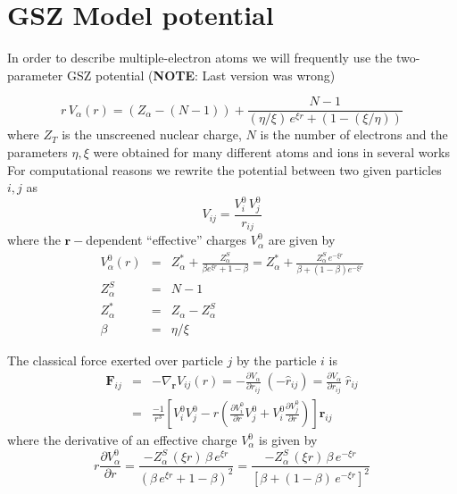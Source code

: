 
\section{GSZ Model potential}

In order to describe multiple-electron atoms we will frequently use the
two-parameter GSZ potential \cite{Garvey1975PRAp1144} (\textbf{NOTE}: Last version was wrong)

\begin{equation}\label{Q:GSZ-V1}
r \, V_{\alpha}(r) =  (Z_{\alpha} - (N - 1)) + \frac{N-1}{\left(
{\eta}/{\xi} \right) \, e^{\xi r} + (1 - \left( {\xi}/{\eta}
\right))}
\end{equation}
where $Z_{T}$ is the unscreened nuclear charge, $N$ is the number of
electrons and the parameters $\eta,\xi$ were obtained for many
different atoms and ions in several works
\cite{Szydlik1974PRAp1885,Garvey1975PRAp1144}
%
For computational reasons we rewrite the potential between two given
particles $i,j$ as
\begin{equation}\label{Q:GSZ-V}
  V_{ij} = \frac{V^{0}_{i} \, V_{j}^{0}}{r_{ij}}
\end{equation}
where the $\bm{r}-$dependent ``effective'' charges $V^{0}_{\alpha}$ are
given by
\begin{eqnarray}
V^{0}_{\alpha}(r) &=&  Z^{*}_{\alpha} + \frac{Z^{S}_{\alpha}}{\beta
e^{\xi r} + 1 - \beta} = Z^{*}_{\alpha} + \frac{Z^{S}_{\alpha}\,
e^{-\xi r}}{\beta + (1 - \beta)e^{-\xi r}} \label{Q:GSZ-V2}
\\
Z^{S}_{\alpha} &=& N-1  \nonumber \\
Z^{*}_{\alpha} &=& Z_{\alpha} - Z^{S}_{\alpha}  \nonumber \\
\beta &=& \eta / \xi  \nonumber
\end{eqnarray}

\noindent The classical force exerted over particle $j$ by the particle
$i$ is
\begin{eqnarray}\label{Q:GSZ-F1}
\bm{F}_{ij} &=& - \nabla_{\bm{r}} V_{ij}(r) =  - \frac{ \partial
V_{\alpha} } {\partial r_{ij} } \; \left(- \hat{r}_{ij} \right)=
\frac{ \partial V_{\alpha} }
{\partial r_{ij} } \; \hat{r}_{ij} \nonumber \\
&=& \frac{-1}{r^{3}}\left[ V^{0}_{i} V^{0}_{j} - r \left(
\frac{\partial V^{0}_{i}}{\partial r} V^{0}_{j} + V^{0}_{i}
\frac{\partial V^{0}_{j}}{\partial r}\right) \right] \bm{r}_{ij}
\end{eqnarray}
where the derivative of an effective charge $V^{0}_{\alpha}$ is given
by
\begin{equation}\label{Q:GSZ-F2}
r \frac{\partial V^{0}_{\alpha}}{\partial r} = \frac{- Z^{S}_{\alpha}
\, (\xi r) \, \beta \, e^{\xi r}}{\left( \beta \, e^{\xi r} +1 -
\beta \right)^{2}} = \frac{- Z^{S}_{\alpha} \, (\xi r) \, \beta \,
e^{-\xi r}}{\left[ \beta + (1 - \beta)\, e^{-\xi r}  \right]^{2}}
\end{equation}

